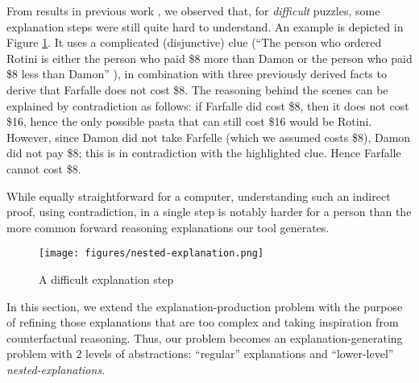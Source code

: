 From results in previous work \cite{ecai/BogaertsGCG20}, we observed that, for \textit{difficult} puzzles, some explanation steps were still quite hard to understand.
An example is depicted in Figure \ref{fig:pasta_diff}.
It uses a complicated (disjunctive) clue (``The person who ordered Rotini is either the person who paid \$8 more than Damon or the person who paid \$8 less than Damon'' ), in combination with three previously derived facts to derive that Farfalle does not cost \$8.
The reasoning behind the scenes can be explained by contradiction as follows: if Farfalle did cost \$8, then it does not cost \$16, hence the only possible pasta that can still cost \$16 would be Rotini.
However, since Damon did not take Farfelle (which we assumed costs \$8), Damon did not pay \$8; this is in contradiction with the highlighted clue. Hence Farfalle cannot cost \$8.

While equally straightforward for a computer, understanding such an indirect proof, using contradiction, in a single step is notably harder for a person than the more common forward reasoning explanations our tool generates.

\begin{figure}[t]
    \texttt{[image: figures/nested-explanation.png]}
    \caption{A difficult explanation step}\label{fig:pasta_diff}
\end{figure}

In this section, we extend the explanation-production problem with the purpose of refining those explanations that are too complex and taking inspiration from counterfactual reasoning.
Thus, our problem becomes an explanation-generating problem with 2 levels of abstractions: ``regular'' explanations and ``lower-level'' \textit{nested-explanations}.






